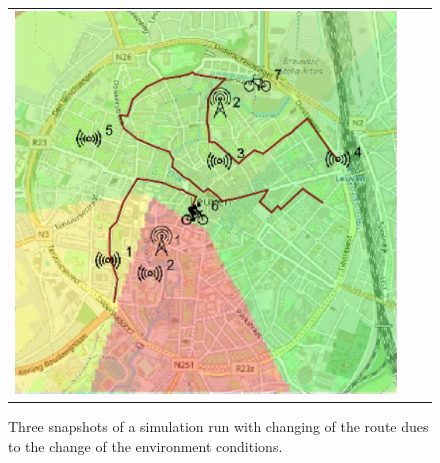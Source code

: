 \begin{figure}[h]
\begin{tabular}{lll}
         \includegraphics[scale=0.42]{figures/sim1snap3.png} 
    \end{tabular}
    \caption[Snapshots of a simulation run of the first scenario (case study 1)]{Three snapshots of a simulation run with changing of the route dues to the change of the environment conditions.}
    \label{fig:sim1}
\end{figure}
% 

